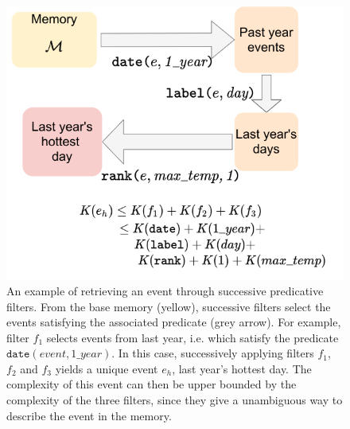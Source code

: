 \documentclass[conference]{IEEEtran}
\begin{document}

\begin{figure}[ht]
  \centering
  \includegraphics[width=0.9\linewidth]{figures/filters}
  \caption{An example of retrieving an event through successive predicative
   filters. From the base memory (yellow), successive filters select the
   events satisfying the associated predicate (grey arrow). For example,
   filter $f_1$ selects events from last year, i.e. which satisfy the
   predicate $\mathtt{date}(event, 1\_year)$. In this case, successively
   applying filters $f_1$, $f_2$ and $f_3$ yields a unique event $e_h$, last
   year's hottest day. The complexity of this event can then be upper bounded
   by the complexity of the three filters, since they give a unambiguous way
   to describe the event in the memory.}
  \label{fig:filters}
\end{figure}
\end{document}
